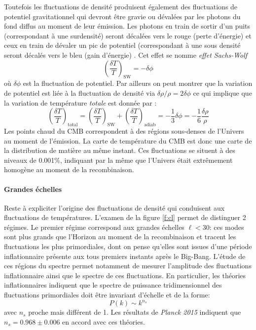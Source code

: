 Toutefois les fluctuations de densité produisent également des fluctuations de potentiel gravitationnel qui devront être gravie ou dévalées par les photons du fond diffus au moment de leur émission. Les photons en train de sortir d'un puits (correspondant à une surdensité) seront décalées vers le rouge (perte d'énergie) et ceux en train de dévaler un pic de potentiel (correspondant à une sous densité seront décalés vers le bleu (gain d'énergie) . Cet effet se nomme \textit{effet Sachs-Wolf}
\begin{equation}
\left(\frac{\delta T}{T}\right)_\mathrm{SW}=-\delta\phi
\end{equation}
où $\delta \phi$ est la fluctuation de potentiel. Par ailleurs on peut montrer que la variation de potentiel est liée à la fluctuation de densité via $\delta \rho/\rho=2\delta \phi$ ce qui implique que la variation de température \textit{totale} est donnée par :
\begin{equation}
\left(\frac{\delta T}{T}\right)_\mathrm{total}=\left(\frac{\delta T}{T}\right)_\mathrm{SW}+\left(\frac{\delta T}{T}\right)_\mathrm{adiab}=-\frac{1}{3}\delta \phi=-\frac{1}{6}\frac{\delta \rho}{\rho}
\end{equation}
Les points chaud du CMB correspondent à des régions sous-denses de l'Univers au moment de l'émission. La carte de température du CMB est donc une carte de la distribution de matière au même instant. Ces fluctuations se situent à des niveaux de 0.001\%, indiquant par la même que l'Univers était extrêmement homogène au moment de la recombinaison.

\paragraph{Grandes échelles} Reste à expliciter l'origine des fluctuations de densité qui conduisent aux fluctuations de températures. L'examen de la figure \ref{f:cl} permet de distinguer 2 régimes. Le premier régime correspond aux grandes échelles $\ell<30$: ces modes sont plus grands que l'Horizon au moment de la recombinaison et tracent les fluctuations les plus primordiales, dont on pense qu'elles sont issues d'une période inflationnaire présente aux tous premiers instants après le Big-Bang. L'étude de ces régions du spectre permet notamment de mesurer l'amplitude des fluctuations inflationnaire ainsi que le spectre de ces fluctuations. En particulier, les théories inflationnaires indiquent que le spectre de puissance tridimensionnel des fluctuations primordiales doit être invariant d'échelle et de la forme:
\begin{equation}
P(k)\sim k^{n_s}
\end{equation}
avec $n_s$ proche mais différent de 1. Les résultats de \textit{Planck 2015} indiquent que $n_s=0.968\pm0.006$ en accord avec ces théories.

